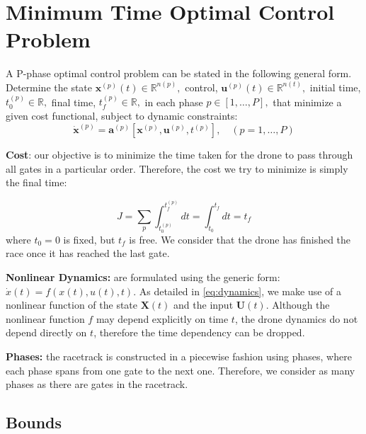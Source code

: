 \section{Minimum Time Optimal Control Problem}
\label{ssec:optimization_problem}

A P-phase optimal control problem can be stated in the following general form.
 Determine the state
$\mathbf{x}^{(p)}(t) \in \mathbb{R}^{n(p)},$ control, $\mathbf{u}^{(p)}(t) \in \mathbb{R}^{n(t)},$ initial time, $t_{0}^{(p)} \in \mathbb{R},$ final time, $t_{f}^{(p)} \in \mathbb{R},$
in each phase $p \in[1, \ldots, P],$ that minimize a given cost functional, subject to dynamic constraints:
$$\dot{\mathbf{x}}^{(p)}=\mathbf{a}^{(p)}\left[\mathbf{x}^{(p)}, \mathbf{u}^{(p)}, t^{(p)}\right], \quad(p=1, \ldots, P)$$

\textbf{Cost}: our objective is to minimize the time taken for the drone to pass through all gates in a particular order.
Therefore, the cost we try to minimize is simply the final time:

$$J= \sum_{p}\int_{t^{(p)}_0}^{t^{(p)}_f} d t =\int_{t_{0}}^{t_{f}} d t = t_f$$
where $t_0 = 0$ is fixed, but $t_f$ is free.
We consider that the drone has finished the race once it has reached the last gate.

\textbf{Nonlinear Dynamics:} are formulated using the generic form: $\dot{x}(t)= f(x(t), u(t), t).$
As detailed in \cref{eq:dynamics}, we make use of a nonlinear function of the state $\boldsymbol{X}(t)$ and the input $\boldsymbol{U}(t)$.
Although the nonlinear function $f$ may depend explicitly on time $t$, the drone dynamics do not depend directly on $t$, therefore the time dependency can be dropped.

\textbf{Phases:}
the racetrack is constructed in a piecewise fashion using phases, where each phase spans from one gate to the next one.
Therefore, we consider as many phases as there are gates in the racetrack.

\subsection{Bounds} 

